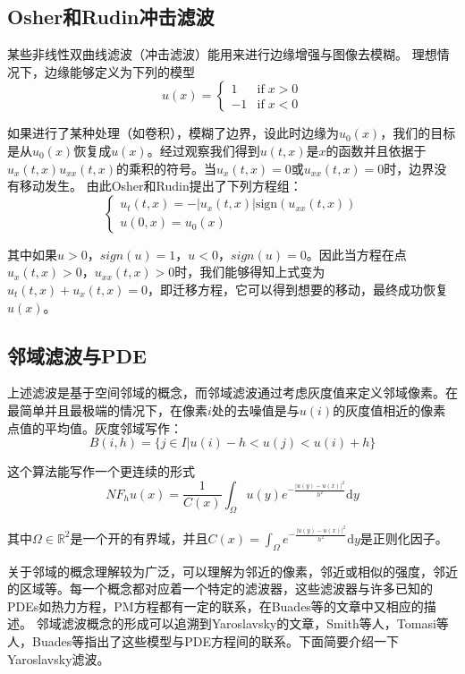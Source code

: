 \documentclass[a4paper,12pt]{article}
\begin{document}
\subsection{Osher和Rudin冲击滤波}
某些非线性双曲线滤波（冲击滤波）能用来进行边缘增强与图像去模糊。
理想情况下，边缘能够定义为下列的模型
\begin{displaymath}
u(x)=\left\{
\begin{array}{ll}
1& \mathrm{if} \; x>0\\
-1& \mathrm{if} \; x<0
\end{array}\right.
\end{displaymath}

如果进行了某种处理（如卷积），模糊了边界，设此时边缘为$u_0(x)$，我们的目标是从$u_0(x)$恢复成$u(x)$。经过观察我们得到$u(t,x)$是$x$的函数并且依据于$u_x(t,x)u_{xx}(t,x)$的乘积的符号。当$u_x(t,x)=0$或$u_{xx}(t,x)=0$时，边界没有移动发生。
由此Osher和Rudin\cite{osher1990feature}提出了下列方程组：
\begin{displaymath}
\left\{
\begin{array}{ll}
u_t(t,x)=-|u_x(t,x)|\mathrm{sign}(u_{xx}(t,x))\\
u(0,x)=u_0(x)
\end{array}\right.
\end{displaymath}

其中如果$u>0$，$sign(u)=1$，$u<0$，$sign(u)=0$。因此当方程在点$u_x(t,x)>0$，$u_{xx}(t,x)>0$时，我们能够得知上式变为$u_t(t,x)+u_x(t,x)=0$，即迁移方程，它可以得到想要的移动，最终成功恢复$u(x)$。

\subsection{邻域滤波与PDE}
上述滤波是基于空间邻域的概念，而邻域滤波通过考虑灰度值来定义邻域像素。在最简单并且最极端的情况下，在像素$i$处的去噪值是与$u(i)$的灰度值相近的像素点值的平均值。灰度邻域写作：
\begin{displaymath}
B(i,h)=\{j\in I|u(i)-h<u(j)<u(i)+h\}
\end{displaymath}

这个算法能写作一个更连续的形式
\begin{displaymath}
NF_hu(x)=\frac{1}{C(x)}\int_{\Omega}u(y)e^{-\frac{|u(y)-u(x)|^2}{h^2}}\mathrm{d}y
\end{displaymath}

其中$\Omega\in \mathbb{R}^2$是一个开的有界域，并且$C(x)=\int_{\Omega}e^{-\frac{|u(y)-u(x)|^2}{h^2}}\mathrm{d}y$是正则化因子。

关于邻域的概念理解较为广泛，可以理解为邻近的像素，邻近或相似的强度，邻近的区域等。每一个概念都对应着一个特定的滤波器，这些滤波器与许多已知的PDEs如热力方程，PM方程都有一定的联系，在Buades等\cite{buades2006neighborhood}的文章中又相应的描述。
邻域滤波概念的形成可以追溯到Yaroslavsky的文章\cite{yaroslavsky1985digital}，Smith等人\cite{smith1997susan}，Tomasi等人\cite{tomasi1998bilateral}，Buades等\cite{buades2006neighborhood}指出了这些模型与PDE方程间的联系。下面简要介绍一下Yaroslavsky滤波。
\end{document}
